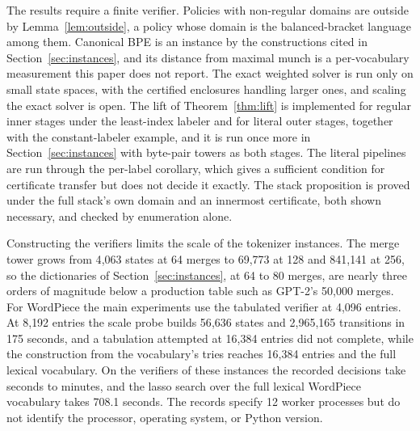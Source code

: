\documentclass[11pt,a4paper]{article}
\theoremstyle{definition}
\theoremstyle{plain}
\begin{document}
The results require a finite verifier. Policies with non-regular domains are outside by Lemma~\ref{lem:outside}, a
policy whose domain is the balanced-bracket language among them. Canonical BPE is an instance by the constructions cited
in Section~\ref{sec:instances}, and its distance from maximal munch is a per-vocabulary measurement this paper does not
report. The exact weighted solver is run only on small state spaces, with the certified enclosures handling larger ones,
and scaling the exact solver is open. The lift of Theorem~\ref{thm:lift} is implemented for regular inner stages under
the least-index labeler and for literal outer stages, together with the constant-labeler example, and it is run once
more in Section~\ref{sec:instances} with byte-pair towers as both stages. The literal pipelines are run through the
per-label corollary, which gives a sufficient condition for certificate transfer but does not decide it exactly. The
stack proposition is proved under the full stack's own domain and an innermost certificate, both shown necessary, and
checked by enumeration alone.

Constructing the verifiers limits the scale of the tokenizer instances. The merge tower grows from 4{,}063 states at 64
merges to 69{,}773 at 128 and 841{,}141 at 256, so the dictionaries of Section~\ref{sec:instances}, at 64 to 80 merges,
are nearly three orders of magnitude below a production table such as GPT-2's 50{,}000 merges. For WordPiece the main
experiments use the tabulated verifier at 4{,}096 entries. At 8{,}192 entries the scale probe builds 56{,}636 states and
2{,}965{,}165 transitions in 175 seconds, and a tabulation attempted at 16{,}384 entries did not complete, while the
construction from the vocabulary's tries reaches 16{,}384 entries and the full lexical vocabulary. On the verifiers of
these instances the recorded decisions take seconds to minutes, and the lasso search over the full lexical WordPiece
vocabulary takes 708.1 seconds. The records specify 12 worker processes but do not identify the processor, operating
system, or Python version.
\end{document}
